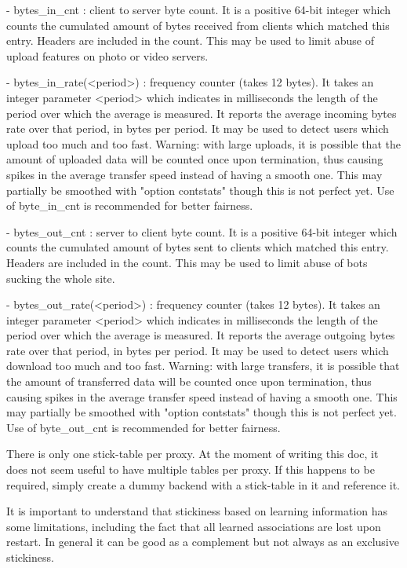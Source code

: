     - bytes_in_cnt : client to server byte count. It is a positive 64-bit
      integer which counts the cumulated amount of bytes received from clients
      which matched this entry. Headers are included in the count. This may be
      used to limit abuse of upload features on photo or video servers.

    - bytes_in_rate(<period>) : frequency counter (takes 12 bytes). It takes an
      integer parameter <period> which indicates in milliseconds the length
      of the period over which the average is measured. It reports the average
      incoming bytes rate over that period, in bytes per period. It may be used
      to detect users which upload too much and too fast. Warning: with large
      uploads, it is possible that the amount of uploaded data will be counted
      once upon termination, thus causing spikes in the average transfer speed
      instead of having a smooth one. This may partially be smoothed with
      "option contstats" though this is not perfect yet. Use of byte_in_cnt is
      recommended for better fairness.

    - bytes_out_cnt : server to client byte count. It is a positive 64-bit
      integer which counts the cumulated amount of bytes sent to clients which
      matched this entry. Headers are included in the count. This may be used
      to limit abuse of bots sucking the whole site.

    - bytes_out_rate(<period>) : frequency counter (takes 12 bytes). It takes
      an integer parameter <period> which indicates in milliseconds the length
      of the period over which the average is measured. It reports the average
      outgoing bytes rate over that period, in bytes per period. It may be used
      to detect users which download too much and too fast. Warning: with large
      transfers, it is possible that the amount of transferred data will be
      counted once upon termination, thus causing spikes in the average
      transfer speed instead of having a smooth one. This may partially be
      smoothed with "option contstats" though this is not perfect yet. Use of
      byte_out_cnt is recommended for better fairness.

  There is only one stick-table per proxy. At the moment of writing this doc,
  it does not seem useful to have multiple tables per proxy. If this happens
  to be required, simply create a dummy backend with a stick-table in it and
  reference it.

  It is important to understand that stickiness based on learning information
  has some limitations, including the fact that all learned associations are
  lost upon restart. In general it can be good as a complement but not always
  as an exclusive stickiness.

